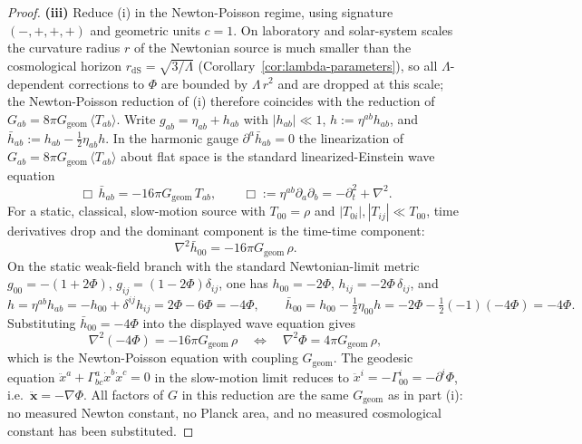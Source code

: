 \documentclass[11pt]{article}
\begin{document}
\begin{proof}
\textbf{(iii)} Reduce (i) in the Newton-Poisson regime, using signature \((-,+,+,+)\) and geometric units \(c=1\). On laboratory and solar-system scales the curvature radius \(r\) of the Newtonian source is much smaller than the cosmological horizon \(r_{\mathrm{dS}}=\sqrt{3/\Lambda}\) (Corollary~\ref{cor:lambda-parameters}), so all \(\Lambda\)-dependent corrections to \(\Phi\) are bounded by \(\Lambda\,r^2\) and are dropped at this scale; the Newton-Poisson reduction of (i) therefore coincides with the reduction of \(G_{ab}=8\pi G_{\mathrm{geom}}\,\langle T_{ab}\rangle\). Write \(g_{ab}=\eta_{ab}+h_{ab}\) with \(|h_{ab}|\ll 1\), \(h:=\eta^{ab}h_{ab}\), and \(\bar h_{ab}:=h_{ab}-\tfrac12\eta_{ab}h\). In the harmonic gauge \(\partial^a\bar h_{ab}=0\) the linearization of \(G_{ab}=8\pi G_{\mathrm{geom}}\,\langle T_{ab}\rangle\) about flat space is the standard linearized-Einstein wave equation
\[
\Box\,\bar h_{ab}=-16\pi G_{\mathrm{geom}}\,T_{ab},
\qquad
\Box:=\eta^{ab}\partial_a\partial_b=-\partial_t^2+\nabla^2.
\]
For a static, classical, slow-motion source with \(T_{00}=\rho\) and \(|T_{0i}|,|T_{ij}|\ll T_{00}\), time derivatives drop and the dominant component is the time-time component:
\[
\nabla^2\bar h_{00}=-16\pi G_{\mathrm{geom}}\,\rho.
\]
On the static weak-field branch with the standard Newtonian-limit metric \(g_{00}=-(1+2\Phi)\), \(g_{ij}=(1-2\Phi)\delta_{ij}\), one has \(h_{00}=-2\Phi\), \(h_{ij}=-2\Phi\,\delta_{ij}\), and
\[
h=\eta^{ab}h_{ab}=-h_{00}+\delta^{ij}h_{ij}=2\Phi-6\Phi=-4\Phi,
\qquad
\bar h_{00}=h_{00}-\tfrac12\eta_{00}h=-2\Phi-\tfrac12(-1)(-4\Phi)=-4\Phi.
\]
Substituting \(\bar h_{00}=-4\Phi\) into the displayed wave equation gives
\[
\nabla^2(-4\Phi)=-16\pi G_{\mathrm{geom}}\,\rho
\quad\Longleftrightarrow\quad
\nabla^2\Phi=4\pi G_{\mathrm{geom}}\,\rho,
\]
which is the Newton-Poisson equation with coupling \(G_{\mathrm{geom}}\). The geodesic equation \(\ddot x^a+\Gamma^a_{bc}\dot x^b\dot x^c=0\) in the slow-motion limit reduces to \(\ddot x^i=-\Gamma^i_{00}=-\partial^i\Phi\), i.e.\ \(\ddot{\mathbf x}=-\nabla\Phi\). All factors of \(G\) in this reduction are the same \(G_{\mathrm{geom}}\) as in part (i): no measured Newton constant, no Planck area, and no measured cosmological constant has been substituted.
\end{proof}
\end{document}
